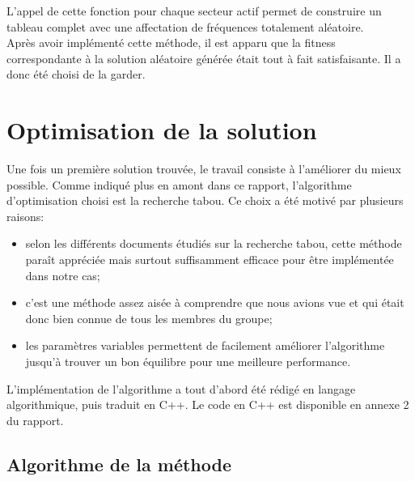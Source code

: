 \documentclass[a4paper, 11pt]{report}
\begin{document}
	L'appel de cette fonction pour chaque secteur actif permet de construire un tableau complet avec une affectation de fréquences totalement aléatoire.\\
	Après avoir implémenté cette méthode, il est apparu que la fitness correspondante à la solution aléatoire générée était tout à fait satisfaisante. Il a donc été choisi de la garder.
	
	\section{Optimisation de la solution}
	
	Une fois un première solution trouvée, le travail consiste à l'améliorer du mieux possible. Comme indiqué plus en amont dans ce rapport, l'algorithme d'optimisation choisi est la recherche tabou. Ce choix a été motivé par plusieurs raisons:
	\begin{itemize}
		\item selon les différents documents étudiés sur la recherche tabou, cette méthode paraît appréciée mais surtout suffisamment efficace pour être implémentée dans notre cas;
		\item c'est une méthode assez aisée à comprendre que nous avions vue et qui était donc bien connue de tous les membres du groupe;
		\item les paramètres variables permettent de facilement améliorer l'algorithme jusqu'à trouver un bon équilibre pour une meilleure performance.
	\end{itemize}
	
	L'implémentation de l'algorithme a tout d'abord été rédigé en langage algorithmique, puis traduit en C++. Le code en C++ est disponible en annexe 2 du rapport.\\
	
		\subsection{Algorithme de la méthode}
		
\end{document}
